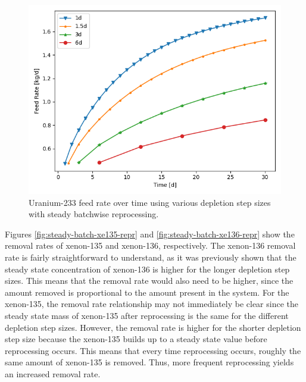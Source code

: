 \begin{figure}[H]
  \centering
  \includegraphics[scale=0.5]{images/feed_U233_6d_sp_comp.png}
  \caption{Uranium-233 feed rate over time using various depletion step sizes with steady batchwise reprocessing.}
   \label{fig:steady-batch-u-repr}
\end{figure}

Figures \ref{fig:steady-batch-xe135-repr} and \ref{fig:steady-batch-xe136-repr} show the removal rates of xenon-135 and xenon-136, respectively. The xenon-136 removal rate is fairly straightforward to understand, as it was previously shown that the steady state concentration of xenon-136 is higher for the longer depletion step sizes. This means that the removal rate would also need to be higher, since the amount removed is proportional to the amount present in the system. For the xenon-135, the removal rate relationship may not immediately be clear since the steady state mass of xenon-135 after reprocessing is the same for the different depletion step sizes. However, the removal rate is higher for the shorter depletion step size because the xenon-135 builds up to a steady state value before reprocessing occurs. This means that every time reprocessing occurs, roughly the same amount of xenon-135 is removed. Thus, more frequent reprocessing yields an increased removal rate.

